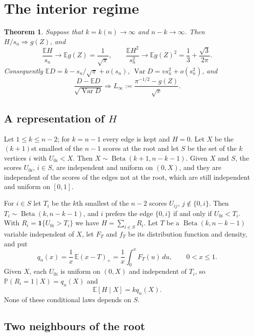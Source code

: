 \documentclass[11pt]{amsart}
\newtheorem{theorem}{Theorem}[section]
\theoremstyle{remark}
\numberwithin{equation}{section}
\newcommand{\E}{\mathbb E}
\newcommand{\Pp}{\mathbb P}
\newcommand{\1}{\mathbf 1}
\newcommand{\Var}{\operatorname{Var}}
\newcommand{\Bet}{\operatorname{Beta}}
\begin{document}
\section{The interior regime}\label{sec:interior}

\begin{theorem}\label{thm:interior}
Suppose that $k=k(n)\to\infty$ and $n-k\to\infty$. Then $H/s_n\Rightarrow g(Z)$, and
\[
\frac{\E H}{s_n}\to\E g(Z)=\frac1{\sqrt\pi},\qquad \frac{\E H^2}{s_n^2}\to\E g(Z)^2=\frac13+\frac{\sqrt3}{2\pi}.
\]
Consequently $\E D=k-s_n/\sqrt\pi+o(s_n)$, $\Var D=vs_n^2+o(s_n^2)$, and
\[
\frac{D-\E D}{\sqrt{\Var D}}\Longrightarrow L_\infty:=\frac{\pi^{-1/2}-g(Z)}{\sqrt v}.
\]
\end{theorem}

\subsection{A representation of \texorpdfstring{$H$}{H}}
Let $1\le k\le n-2$; for $k=n-1$ every edge is kept and $H=0$. Let $X$ be the $(k+1)$st smallest of the $n-1$ scores at the root and let $S$ be the set of the $k$ vertices $i$ with $U_{0i}<X$. Then $X\sim\Bet(k+1,n-k-1)$. Given $X$ and $S$, the scores $U_{0i}$, $i\in S$, are independent and uniform on $(0,X)$, and they are independent of the scores of the edges not at the root, which are still independent and uniform on $[0,1]$.

For $i\in S$ let $T_i$ be the $k$th smallest of the $n-2$ scores $U_{ij}$, $j\notin\{0,i\}$. Then $T_i\sim\Bet(k,n-k-1)$, and $i$ prefers the edge $\{0,i\}$ if and only if $U_{0i}<T_i$. With $R_i=\1\{U_{0i}>T_i\}$ we have $H=\sum_{i\in S}R_i$. Let $T$ be a $\Bet(k,n-k-1)$ variable independent of $X$, let $F_T$ and $f_T$ be its distribution function and density, and put
\begin{equation}\label{eq:q}
q_n(x)=\frac1x\,\E(x-T)_+=\frac1x\int_0^xF_T(u)\,du,\qquad 0<x\le1.
\end{equation}
Given $X$, each $U_{0i}$ is uniform on $(0,X)$ and independent of $T_i$, so $\Pp(R_i=1\mid X)=q_n(X)$ and
\begin{equation}\label{eq:condmean}
\E[H\mid X]=kq_n(X).
\end{equation}
None of these conditional laws depends on $S$.

\subsection{Two neighbours of the root}
\end{document}
